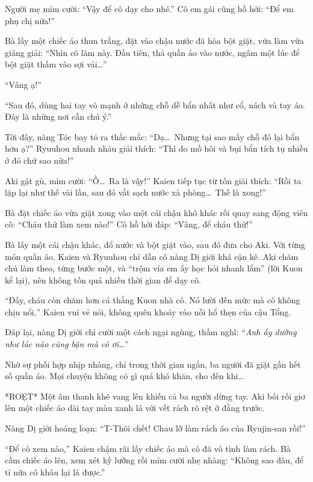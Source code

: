 \documentclass[../main.tex]{subfiles}
\begin{document}
Người mẹ mỉm cười: ``Vậy để cô dạy cho nhé.'' Cô em gái cũng hồ hởi: ``Để em phụ chị nữa!''

Bà lấy một chiếc áo thun trắng, đặt vào chậu nước đã hòa bột giặt, vừa làm vừa giảng giải: ``Nhìn cô làm này. Đầu tiên, thả quần áo vào nước, ngâm một lúc để bột giặt thấm vào sợi vải\dots''

``Vâng ạ!''

``Sau đó, dùng hai tay vò mạnh ở những chỗ dễ bẩn nhất như cổ, nách và tay áo. Đây là những nơi cần chú ý.''

Tới đây, nàng Tóc bay tỏ ra thắc mắc: ``Dạ\dots\ Nhưng tại sao mấy chỗ đó lại bẩn hơn ạ?'' Ryuuhou nhanh nhảu giải thích: ``Thì do mồ hôi và bụi bẩn tích tụ nhiều ở đó chứ sao nữa!''

Aki gật gù, mỉm cười: ``Ồ\dots\ Ra là vậy!'' Kaien tiếp tục từ tốn giải thích: ``Rồi ta lặp lại như thế vài lần, sau đó vắt sạch nước xà phòng\dots\ Thế là xong!''

Bà đặt chiếc áo vừa giặt xong vào một cái chậu khô khác rồi quay sang động viên cô: ``Cháu thử làm xem nào!'' Cô hồ hởi đáp: ``Vâng, để cháu thử!''

Bà lấy một cái chậu khác, đổ nước và bột giặt vào, sau đó đưa cho Aki. Với từng món quần áo, Kaien và Ryuuhou chỉ dẫn cô nàng Dị giới khá cặn kẽ. Aki chăm chú làm theo, từng bước một, và ``trộm vía em ấy học hỏi nhanh lắm'' (lời Kuon kể lại), nên không tốn quá nhiều thời gian để dạy cô.

``Đấy, cháu còn chăm hơn cả thằng Kuon nhà cô. Nó lười đến mức mà cô không chịu nổi,'' Kaien vui vẻ nói, không quên khoáy vào nỗi hổ thẹn của cậu Tổng.

Đáp lại, nàng Dị giới chỉ cười một cách ngại ngùng, thầm nghĩ: ``\textit{Anh ấy dường như lúc nào cũng bận mà cô ơi\dots}''

\ct

Nhờ sự phối hợp nhịp nhàng, chỉ trong thời gian ngắn, ba người đã giặt gần hết số quần áo. Mọi chuyện không có gì quá khó khăn, cho đến khi\dots

*ROẸT* Một âm thanh khẽ vang lên khiến cả ba người dừng tay. Aki bối rối giơ lên một chiếc áo dài tay màu xanh lá với vết rách rõ rệt ở đằng trước.

Nàng Dị giới hoảng loạn: ``T-Thôi chết! Chau lỡ làm rách áo của Ryujin-san rồi!''

``Để cô xem nào,'' Kaien chậm rãi lấy chiếc áo mà cô đã vô tình làm rách. Bà cầm chiếc áo lên, xem xét kỹ lưỡng rồi mỉm cười nhẹ nhàng: ``Không sao đâu, để tí nữa cô khâu lại là được.''
\end{document}
